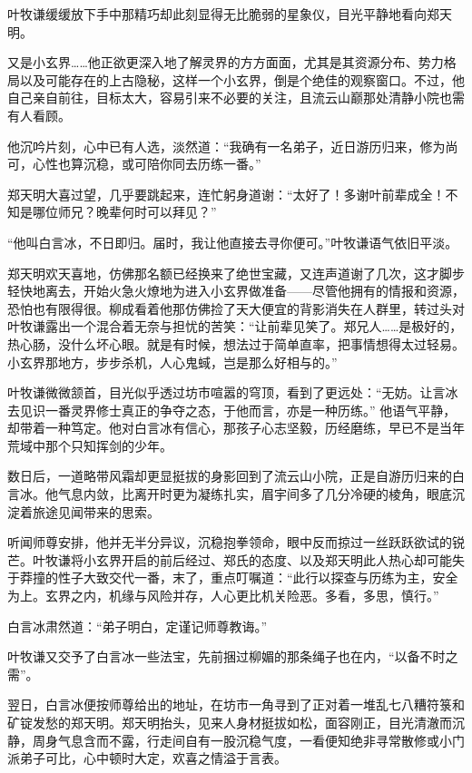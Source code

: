 叶牧谦缓缓放下手中那精巧却此刻显得无比脆弱的星象仪，目光平静地看向郑天明。

又是小玄界……他正欲更深入地了解灵界的方方面面，尤其是其资源分布、势力格局以及可能存在的上古隐秘，这样一个小玄界，倒是个绝佳的观察窗口。不过，他自己亲自前往，目标太大，容易引来不必要的关注，且流云山巅那处清静小院也需有人看顾。

他沉吟片刻，心中已有人选，淡然道：“我确有一名弟子，近日游历归来，修为尚可，心性也算沉稳，或可陪你同去历练一番。”

郑天明大喜过望，几乎要跳起来，连忙躬身道谢：“太好了！多谢叶前辈成全！不知是哪位师兄？晚辈何时可以拜见？”

“他叫白言冰，不日即归。届时，我让他直接去寻你便可。”叶牧谦语气依旧平淡。

郑天明欢天喜地，仿佛那名额已经换来了绝世宝藏，又连声道谢了几次，这才脚步轻快地离去，开始火急火燎地为进入小玄界做准备——尽管他拥有的情报和资源，恐怕也有限得很。柳成看着他那仿佛捡了天大便宜的背影消失在人群里，转过头对叶牧谦露出一个混合着无奈与担忧的苦笑：“让前辈见笑了。郑兄人……是极好的，热心肠，没什么坏心眼。就是有时候，想法过于简单直率，把事情想得太过轻易。小玄界那地方，步步杀机，人心鬼蜮，岂是那么好相与的。”

叶牧谦微微颔首，目光似乎透过坊市喧嚣的穹顶，看到了更远处：“无妨。让言冰去见识一番灵界修士真正的争夺之态，于他而言，亦是一种历练。” 他语气平静，却带着一种笃定。他对白言冰有信心，那孩子心志坚毅，历经磨练，早已不是当年荒域中那个只知挥剑的少年。

\vspace{2em}

数日后，一道略带风霜却更显挺拔的身影回到了流云山小院，正是自游历归来的白言冰。他气息内敛，比离开时更为凝练扎实，眉宇间多了几分冷硬的棱角，眼底沉淀着旅途见闻带来的思索。

听闻师尊安排，他并无半分异议，沉稳抱拳领命，眼中反而掠过一丝跃跃欲试的锐芒。叶牧谦将小玄界开启的前后经过、郑氏的态度、以及郑天明此人热心却可能失于莽撞的性子大致交代一番，末了，重点叮嘱道：“此行以探查与历练为主，安全为上。玄界之内，机缘与风险并存，人心更比机关险恶。多看，多思，慎行。”

白言冰肃然道：“弟子明白，定谨记师尊教诲。”

叶牧谦又交予了白言冰一些法宝，先前捆过柳媚的那条绳子也在内，“以备不时之需”。

翌日，白言冰便按师尊给出的地址，在坊市一角寻到了正对着一堆乱七八糟符箓和矿锭发愁的郑天明。郑天明抬头，见来人身材挺拔如松，面容刚正，目光清澈而沉静，周身气息含而不露，行走间自有一股沉稳气度，一看便知绝非寻常散修或小门派弟子可比，心中顿时大定，欢喜之情溢于言表。

